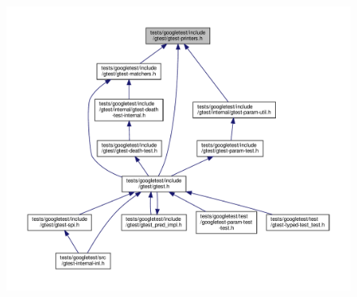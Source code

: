 \begin{figure}[H]
\begin{center}
\leavevmode
\includegraphics[width=350pt]{gtest-printers_8h__dep__incl}
\end{center}
\end{figure}
